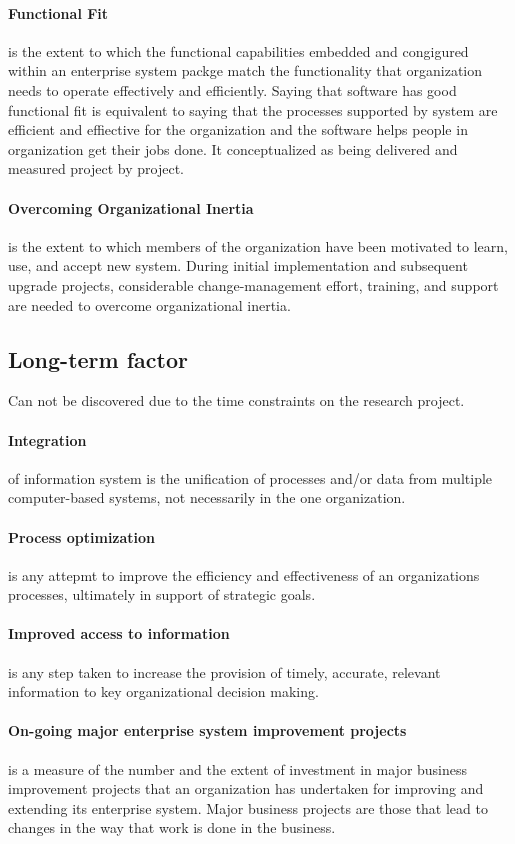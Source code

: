 \paragraph{Functional Fit} is the extent to which the functional capabilities embedded and congigured within an enterprise system packge match the functionality that organization needs to operate effectively and efficiently. Saying that software has good functional fit is equivalent to saying that the processes supported by system are efficient and effiective for the organization and the software helps people in organization get their jobs done. It conceptualized as being delivered and measured project by project.
\paragraph{Overcoming Organizational Inertia} is the extent to which members of the organization have been motivated to learn, use, and accept new system. During initial implementation and subsequent upgrade projects, considerable change-management effort, training, and support are needed to overcome organizational inertia.

\subsection{Long-term factor}
Can not be discovered due to the time constraints on the research project.
\paragraph{Integration} of information system is the unification of processes and/or data from multiple computer-based systems, not necessarily in the one organization.
\paragraph{Process optimization} is any attepmt to improve the efficiency and effectiveness of an organizations processes, ultimately in support of strategic goals.
\paragraph{Improved access to information} is any step taken to increase the provision of timely, accurate, relevant information to key organizational decision making.
\paragraph{On-going major enterprise system improvement projects} is a measure of the number and the extent of investment in major business improvement projects that an organization has undertaken for improving and extending its enterprise system. Major business projects are those that lead to changes in the way that work is done in the business.

